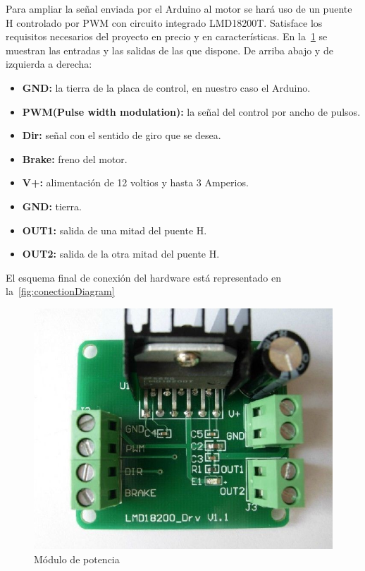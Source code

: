 
Para ampliar la señal enviada por el Arduino al motor se hará uso de un puente H controlado por PWM con circuito integrado LMD18200T\@.
Satisface los requisitos necesarios del proyecto en precio y en características.
En la~\cref{fig:Hbridge} se muestran las entradas y las salidas de las que dispone.
De arriba abajo y de izquierda a derecha:
\begin{itemize}
	\item \textbf{GND:} la tierra de la placa de control, en nuestro caso el Arduino.
	\item \textbf{PWM(Pulse width modulation):} la señal del control por ancho de pulsos.
	\item \textbf{Dir:} señal con el sentido de giro que se desea.
	\item \textbf{Brake:} freno del motor.
	\item \textbf{V+:} alimentación de 12 voltios y hasta 3 Amperios.
	\item \textbf{GND:} tierra.
	\item \textbf{OUT1:} salida de una mitad del puente H\@.
	\item \textbf{OUT2:} salida de la otra mitad del puente H\@.
\end{itemize}

El esquema final de conexión del hardware está representado en la~\cref{fig:conectionDiagram}\\

\begin{figure}[H]
		\centering
		\includegraphics[scale = 0.3]{part/Proyecto_ejecutivo/memoria_constructiva/motor/img/modulopot}
		\caption{Módulo de potencia}\label{fig:Hbridge}
\end{figure}

